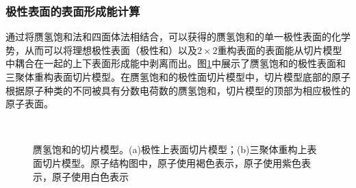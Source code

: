 \subsubsection{极性表面的表面形成能计算}
通过将赝氢饱和法和四面体法相结合，可以获得的赝氢饱和的单一极性表面的化学势，从而可以将理想极性表面（极性和）以及$2 \times 2$重构表面的表面能从切片模型中耦合在一起的上下表面形成能中剥离而出。图\ref{fig:IS_structure_slab_pseH}中展示了赝氢饱和的极性表面和三聚体重构表面切片模型。在赝氢饱和的极性面切片模型中，切片模型底部的原子根据原子种类的不同被具有分数电荷数的赝氢饱和，切片模型的顶部为相应极性的原子表面。

\begin{figure}[htb]
    \\
    \caption{赝氢饱和的切片模型。(a)极性上表面切片模型；(b)三聚体重构上表面切片模型。原子结构图中，原子使用褐色表示，原子使用紫色表示，原子使用白色表示}
    \label{fig:IS_structure_slab_pseH}
\end{figure}

